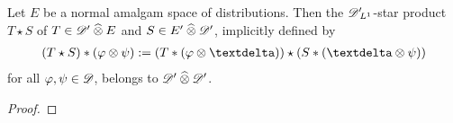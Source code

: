 \begin{corollary}
    Let $ E $ be a normal amalgam space of distributions.
    Then the $\mathscr{  D  }'\hspace{-2pt}{}_{ L^{ 1 } }$-star product $ T \star S $
    of $ T \in \mathscr{  D  }' \mathbin{\widehat{\otimes}} E $ and $ S \in E' \mathbin{\widehat{\otimes}} \mathscr{  D  }' $,
    implicitly defined by
    \begin{align}
        ( T \star S ) * ( \ph \tepro \ps )
        :=
        ( T * ( \ph \tepro \sfdeo ) ) \star ( S * ( \sfdeo \tepro \ps ) )
    \end{align}
    for all $ \varphi,\psi \in \mathscr{  D  } $,
    belongs to $ \mathscr{  D  }' \mathbin{\widehat{\otimes}} \mathscr{  D  }' $.
\end{corollary}
\begin{proof}
    
\end{proof}